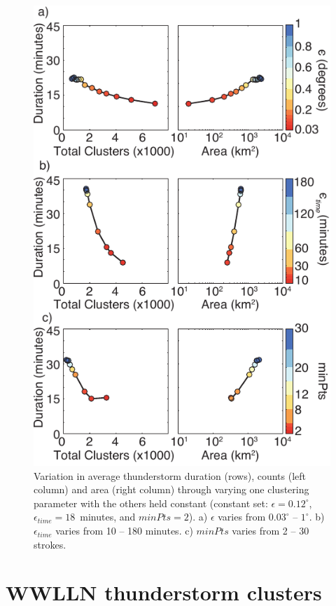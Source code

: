  \begin{figure}[ht!]
    \centering
    \includegraphics[scale=1]{GEC/Figures/parameters.pdf}
    \caption{Variation in average thunderstorm duration (rows), counts (left column) and area (right column) through varying one clustering parameter with the others held constant (constant set: $\epsilon = 0.12^\circ$, $\epsilon_{time} = 18$~minutes, and $minPts = 2$).
    		 a) $\epsilon$ varies from $0.03^\circ$ -- $1^\circ$.
		 b) $\epsilon_{time}$ varies from 10 -- 180 minutes.
		 c) $minPts$ varies from 2 -- 30 strokes.
		 }
    \label{gec:fig:parameters}
 \end{figure}

\section{WWLLN thunderstorm clusters}

